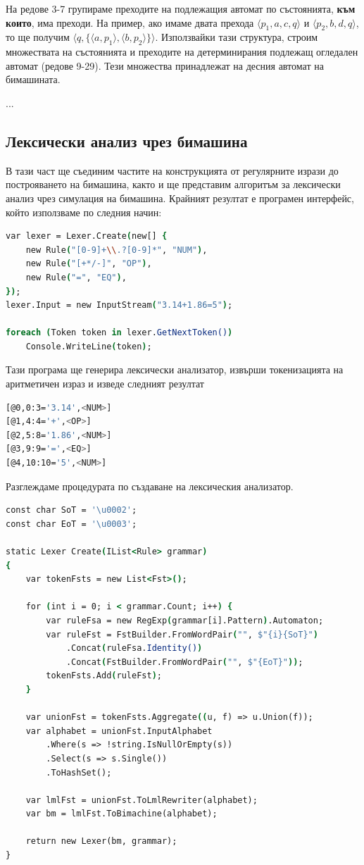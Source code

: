 \documentclass[12pt, oneside]{article}
\theoremstyle{definition}
\begin{document}
На редове 3-7 групираме преходите на подлежащия автомат по състоянията, \textbf{към които}, има преходи. На пример, ако имаме двата прехода \( \langle p_1, a, c, q \rangle \) и \( \langle p_2, b, d, q \rangle \), то ще получим \( \langle q, \{ \langle a, p_1 \rangle, \langle b, p_2 \rangle \} \rangle \). Използвайки тази структура, строим множествата на състоянията и преходите на детерминирания подлежащ огледален автомат (редове 9-29). Тези множества принадлежат на десния автомат на бимашината.

...

\subsection{Лексически анализ чрез бимашина}

В тази част ще съединим частите на конструкцията от регулярните изрази до построяването на бимашина, както и ще представим алгоритъм за лексически анализ чрез симулация на бимашина. Крайният резултат е програмен интерфейс, който използваме по следния начин:

\begin{lstlisting}[language=csh,firstnumber=1]
var lexer = Lexer.Create(new[] {
    new Rule("[0-9]+\\.?[0-9]*", "NUM"),
    new Rule("[+*/-]", "OP"),
    new Rule("=", "EQ"),
});
lexer.Input = new InputStream("3.14+1.86=5");

foreach (Token token in lexer.GetNextToken())
    Console.WriteLine(token);
\end{lstlisting}

Тази програма ще генерира лексически анализатор, извърши токенизацията на аритметичен израз и изведе следният резултат

\begin{lstlisting}[language=bash]
[@0,0:3='3.14',<NUM>]
[@1,4:4='+',<OP>]
[@2,5:8='1.86',<NUM>]
[@3,9:9='=',<EQ>]
[@4,10:10='5',<NUM>]
\end{lstlisting}

Разглеждаме процедурата по създаване на лексическия анализатор.

\begin{lstlisting}[language=csh]
const char SoT = '\u0002';
const char EoT = '\u0003';

static Lexer Create(IList<Rule> grammar)
{
    var tokenFsts = new List<Fst>();

    for (int i = 0; i < grammar.Count; i++) {
        var ruleFsa = new RegExp(grammar[i].Pattern).Automaton;
        var ruleFst = FstBuilder.FromWordPair("", $"{i}{SoT}")
            .Concat(ruleFsa.Identity())
            .Concat(FstBuilder.FromWordPair("", $"{EoT}"));
        tokenFsts.Add(ruleFst);
    }

    var unionFst = tokenFsts.Aggregate((u, f) => u.Union(f));
    var alphabet = unionFst.InputAlphabet
	    .Where(s => !string.IsNullOrEmpty(s))
	    .Select(s => s.Single())
	    .ToHashSet();

    var lmlFst = unionFst.ToLmlRewriter(alphabet);
    var bm = lmlFst.ToBimachine(alphabet);

    return new Lexer(bm, grammar);
}
\end{lstlisting}
\end{document}
